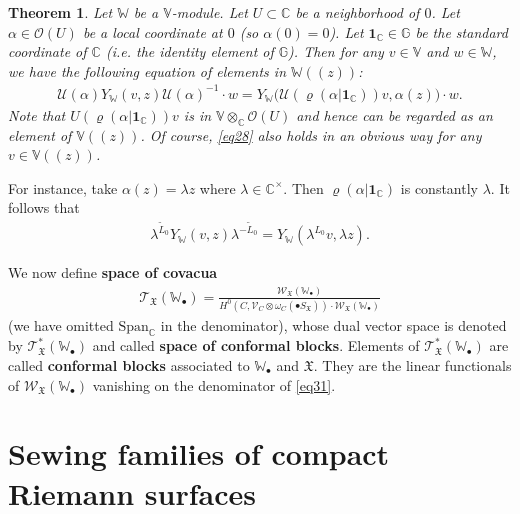 \documentclass[12pt,a4paper,notitlepage]{article}
\theoremstyle{definition}
\theoremstyle{plain}
\newtheorem{thm}[df]{Theorem}
\newcommand{\fk}{\mathfrak}
\newcommand{\mc}{\mathcal}
\newcommand{\wtd}{\widetilde}
\newcommand{\id}{\mathbf{1}}
\newcommand{\Span}{\mathrm{Span}}
\newcommand{\scr}{\mathscr}
\newcommand{\blt}{\bullet}
\newcommand{\Vbb}{\mathbb V}
\newcommand{\Wbb}{\mathbb W}
\newcommand{\Gbb}{\mathbb G}
\newcommand{\Cbb}{\mathbb C}
\numberwithin{equation}{section}
\begin{document}
\begin{thm}\label{lb14}
	Let $\Wbb$ be a $\Vbb$-module. Let $U\subset\Cbb$ be a neighborhood of $0$. Let $\alpha\in\scr O(U)$ be a local coordinate at $0$ (so $\alpha(0)=0$). Let $\id_\Cbb\in\Gbb$ be the standard coordinate of $\Cbb$ (i.e.  the identity element of $\Gbb$). Then for any $v\in\Vbb$ and $w\in\Wbb$, we have the following equation of elements in $\Wbb((z))$:
	\begin{align}
	\mc U(\alpha)Y_\Wbb(v,z)\mc U(\alpha)^{-1}\cdot w=Y_{\Wbb}\big(\mc U(\varrho(\alpha|\id_\Cbb))v,\alpha(z)\big)\cdot w.\label{eq28}
	\end{align}
	Note that $U(\varrho(\alpha|\id_\Cbb))v$ is in $\Vbb\otimes_{\Cbb}\scr O(U)$ and hence can be regarded as an element of $\Vbb((z))$. Of course, \eqref{eq28} also holds in an obvious way for any $v\in\Vbb((z))$.
\end{thm}


For instance, take $\alpha(z)=\lambda z$ where $\lambda\in\Cbb^\times$. Then $\varrho(\alpha|\id_\Cbb)$ is constantly $\lambda$. It follows that
\begin{align}
\lambda^{\wtd L_0}Y_\Wbb(v,z)\lambda^{-\wtd L_0}=Y_\Wbb(\lambda^{L_0}v,\lambda z).\label{eq63}
\end{align}




We now define  \textbf{space of covacua} 
\begin{gather}
\scr T_{\fk X}(\Wbb_\blt)=\frac{\scr W_{\fk X}(\Wbb_\blt)}{H^0(C,\scr V_C\otimes\omega_C(\blt S_{\fk X}))\cdot \scr W_{\fk X}(\Wbb_\blt)}\label{eq31}
\end{gather}
(we have omitted $\Span_\Cbb$ in the denominator), whose dual vector space is denoted by $\scr T_{\fk X}^*(\Wbb_\blt)$ \index{T@$\scr T_{\fk X}^*(\Wbb_\blt),\scr T_{\fk X}^*(\Wbb_\blt)(\mc B)$} and called \textbf{space of conformal blocks}.  Elements of $\scr T_{\fk X}^*(\Wbb_\blt)$ are called \textbf{conformal blocks} associated to $\Wbb_\blt$ and $\fk X$. They are the linear functionals of $\scr W_{\fk X}(\Wbb_\blt)$ vanishing on the denominator of \eqref{eq31}.














\section{Sewing families of compact Riemann surfaces}\label{lb6}
\end{document}
